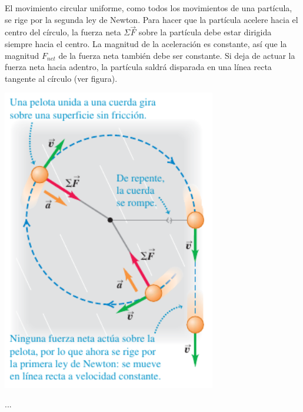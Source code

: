 \documentclass{article}
\begin{document}
    \begin{multicols}{2}

        \begin{minipage}{0.5\textwidth}
            \par El movimiento circular uniforme, como todos los movimientos de una partícula, se rige por la segunda ley de Newton. Para hacer que la partícula acelere hacia el centro del círculo, la fuerza neta $\Sigma \vec{F}$ sobre la partícula debe estar dirigida siempre hacia el centro. La magnitud de la aceleración es constante, así que la magnitud $F_{net}$ de la fuerza neta también debe ser constante. Si deja de actuar la fuerza neta hacia adentro, la partícula saldrá disparada en una línea recta tangente al círculo (ver figura).
        \end{minipage}

        \columnbreak

        \begin{minipage}{0.5\textwidth}
            \centering
            \includegraphics[width=0.7\textwidth]{img/3.3-8.png}
        \end{minipage}

    \end{multicols}

    \par ...
\end{document}
